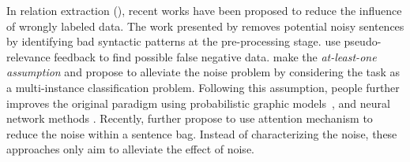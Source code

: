 In relation extraction (\RE), recent works  have been proposed to reduce the influence of wrongly labeled data.
The work presented by \cite{takamatsu2012reducing} removes potential noisy sentences by identifying bad syntactic
patterns at the pre-processing stage. \cite{xu2013filling} use pseudo-relevance feedback to find
possible false negative data. 
\cite{riedel2010modeling} make the \emph{at-least-one assumption} 
and 
propose to alleviate the noise problem by considering the \RE task as a multi-instance classification problem.
Following this assumption, people further improves the original paradigm using probabilistic graphic models~\cite{hoffmann2011knowledge,surdeanu2012multi}, and neural network methods \cite{zeng2015distant}. 
Recently, \cite{lin2016neural} further propose to use attention mechanism to reduce the noise within a sentence bag. 
Instead of characterizing the noise, these approaches only aim to alleviate the effect of noise. %
%


